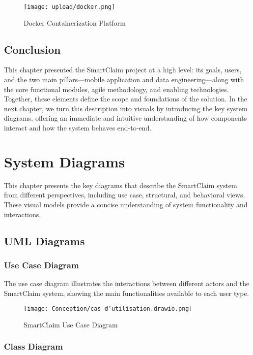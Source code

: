 \documentclass[12pt,a4paper]{report}
\begin{document}
\begin{figure}[H]
    \centering
    \texttt{[image: upload/docker.png]}
    \caption{Docker Containerization Platform}
    \label{fig:docker}
\end{figure}

\section*{Conclusion}
This chapter presented the SmartClaim project at a high level: its goals, users, and the two main pillars—mobile application and data engineering—along with the core functional modules, agile methodology, and enabling technologies. Together, these elements define the scope and foundations of the solution. In the next chapter, we turn this description into visuals by introducing the key system diagrams, offering an immediate and intuitive understanding of how components interact and how the system behaves end-to-end.

\chapter{System Diagrams}

This chapter presents the key diagrams that describe the SmartClaim system from different perspectives, including use case, structural, and behavioral views. These visual models provide a concise understanding of system functionality and interactions.

\section{UML Diagrams}

\subsection{Use Case Diagram}

The use case diagram illustrates the interactions between different actors and the SmartClaim system, showing the main functionalities available to each user type.

\begin{figure}[H]
    \centering
    \texttt{[image: Conception/cas d'utilisation.drawio.png]}
    \caption{SmartClaim Use Case Diagram}
    \label{fig:use_case}
\end{figure}

\subsection{Class Diagram}
\end{document}
